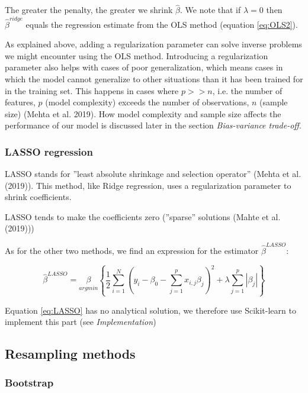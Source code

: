 \documentclass[a4paper]{article}
\begin{document}
The greater the penalty, the greater we shrink $\hat{\beta}$. We note that if $\lambda = 0$ then $\hat{\beta}^{ridge}$ equals the regression estimate from the OLS method (equation \ref{eq:OLS2}).

As explained above, adding a regularization parameter can solve inverse problems we might encounter using the OLS method. Introducing a regularization parameter also helps with cases of poor generalization, which means cases in which the model cannot generalize to other situations than it has been trained for in the training set. This happens in cases where $p >> n$, i.e. the number of features, $p$ (model complexity) exceeds the number of observations, $n$ (sample size) (Mehta et al. 2019). How model complexity and sample size affects the performance of our model is discussed later in the section \textit{Bias-variance trade-off}.

\subsubsection{LASSO regression}

LASSO stands for ''least absolute shrinkage and selection operator'' (Mehta et al. (2019)). This method, like Ridge regression, uses a regularization parameter to shrink coefficients.

LASSO tends to make the coefficients zero (''sparse'' solutions (Mahte et al. (2019)))

As for the other two methods, we find an expression for the estimator $\hat{\beta}^{LASSO}$:

\begin{equation}
\hat{\beta}^{LASSO} = \underset{argmin}{\beta} \left\{ \frac{1}{2} \sum_{i = 1}^{N}(y_{i} - \beta_{0} - \sum_{j = 1}^{p}x_{i, j}\beta_{j})^{2} + \lambda \sum_{j=1}^{p} |\beta_{j}| \right\} \label{eq:LASSO}
\end{equation}

Equation \ref{eq:LASSO} has no analytical solution, we therefore use Scikit-learn to implement this part (see \textit{Implementation})


\subsection{Resampling methods}

\subsubsection{Bootstrap}
\end{document}
